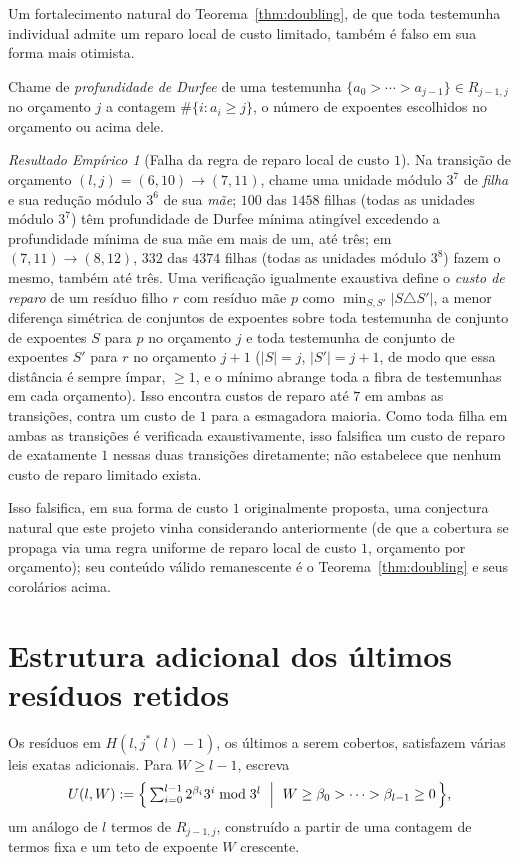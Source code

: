 \documentclass[11pt]{amsart}
\theoremstyle{plain}
\theoremstyle{definition}
\theoremstyle{remark}
\newtheorem{empresult}[theorem]{Resultado Emp\'irico}
\begin{document}
Um fortalecimento natural do Teorema~\ref{thm:doubling}, de que toda testemunha individual admite
um reparo local de custo limitado, também é falso em sua forma mais otimista.

Chame de \emph{profundidade de Durfee} de uma testemunha $\{a_0>\cdots>a_{j-1}\}\in R_{j-1,j}$ no
orçamento $j$ a contagem $\#\{i : a_i \ge j\}$, o número de expoentes escolhidos no orçamento ou
acima dele.

\begin{empresult}[Falha da regra de reparo local de custo $1$]
\label{er:falsify}
Na transição de orçamento $(l,j)=(6,10)\to(7,11)$, chame uma unidade módulo $3^7$ de \emph{filha} e
sua redução módulo $3^6$ de sua \emph{mãe}; $100$ das $1458$ filhas (todas as unidades módulo
$3^7$) têm profundidade de Durfee mínima atingível excedendo a profundidade mínima de sua mãe em
mais de um, até três; em $(7,11)\to(8,12)$, $332$ das $4374$ filhas (todas as unidades módulo
$3^8$) fazem o mesmo, também até três. Uma verificação igualmente exaustiva define o \emph{custo de
reparo} de um resíduo filho $r$ com resíduo mãe $p$ como $\min_{S,S'}|S\triangle S'|$, a menor
diferença simétrica de conjuntos de expoentes sobre toda testemunha de conjunto de expoentes $S$
para $p$ no orçamento $j$ e toda testemunha de conjunto de expoentes $S'$ para $r$ no orçamento
$j+1$ ($|S|=j$, $|S'|=j+1$, de modo que essa distância é sempre ímpar, $\ge1$, e o mínimo abrange
toda a fibra de testemunhas em cada orçamento). Isso encontra custos de reparo até $7$ em ambas as
transições, contra um custo de $1$ para a esmagadora maioria. Como toda filha em ambas as
transições é verificada exaustivamente, isso falsifica um custo de reparo de exatamente $1$ nessas
duas transições diretamente; não estabelece que nenhum custo de reparo limitado exista.
\end{empresult}

Isso falsifica, em sua forma de custo $1$ originalmente proposta, uma conjectura natural que este
projeto vinha considerando anteriormente (de que a cobertura se propaga via uma regra uniforme de
reparo local de custo $1$, orçamento por orçamento); seu conteúdo válido remanescente é o
Teorema~\ref{thm:doubling} e seus corolários acima.

\section{Estrutura adicional dos últimos resíduos retidos}
\label{sec:further}

Os resíduos em $H(l,j^*(l)-1)$, os últimos a serem cobertos, satisfazem várias leis exatas
adicionais. Para $W\ge l-1$, escreva
\[
U(l,W) := \Bigl\{\, \textstyle\sum_{i=0}^{l-1} 2^{\beta_i}3^i \bmod 3^l \ \Bigm|\
W\ge\beta_0>\cdots>\beta_{l-1}\ge0 \,\Bigr\},
\]
um análogo de $l$ termos de $R_{j-1,j}$, construído a partir de uma contagem de termos fixa e um
teto de expoente $W$ crescente.
\end{document}
